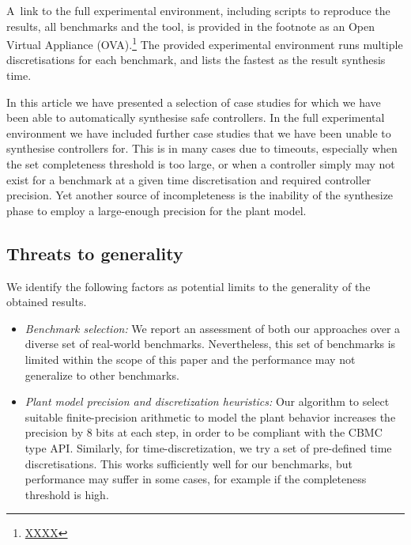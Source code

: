 \smallskip 

A~link to the full experimental environment, including scripts to reproduce the results, all benchmarks and the tool, is provided in the
footnote as an Open Virtual Appliance (OVA).\footnote{\url{XXXX}} 
The provided experimental environment runs multiple discretisations for each benchmark, and lists the fastest as the result synthesis time. 

In this article we have presented a selection of case studies for which we have been able to automatically synthesise safe controllers. 
In the full experimental environment we have included further case studies that we have been unable to synthesise controllers for. 
This is in many cases due to timeouts, 
especially when the set completeness threshold is too large, 
or when a controller simply may not exist for a benchmark at a given time discretisation and required controller precision. 
Yet another source of incompleteness is the inability of the {\sc synthesize} phase to employ a large-enough precision for the plant model.  

\subsection{Threats to generality}
\label{exp:threats-to-validity}

We identify the following factors as potential limits to the generality of the obtained results. 

\begin{itemize} 

\item[] 
\textit{Benchmark selection:} We report an assessment of both our approaches
over a diverse set of real-world benchmarks.  Nevertheless, this set of
benchmarks is limited within the scope of this paper and the performance may
not generalize to other benchmarks.

\item[]
\textit{Plant model precision and discretization heuristics:} Our algorithm to
select suitable finite-precision arithmetic to model the plant behavior 
increases the precision by 8 bits at each step,  
in order to be compliant with the CBMC type API. 
Similarly, for time-discretization, we try a set of pre-defined time discretisations.
This works sufficiently well for our benchmarks, but
performance may suffer in some cases, for example if the completeness
threshold is high. 


\end{itemize} 

